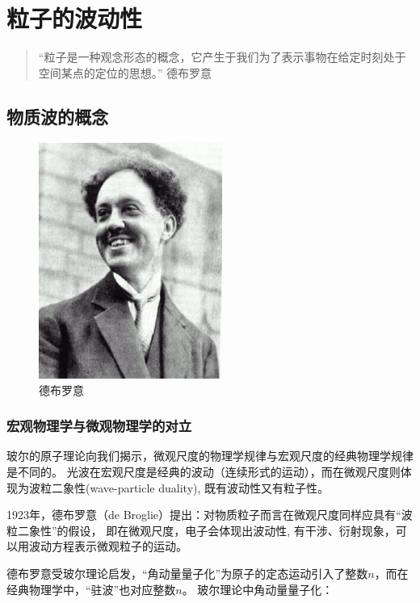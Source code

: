 \section{粒子的波动性}

\begin{quotation}
“粒子是一种观念形态的概念，它产生于我们为了表示事物在给定时刻处于空间某点的定位的思想。” \qquad 德布罗意
\end{quotation}

\subsection{物质波的概念}

\begin{figure}[h]
\begin{center}
\includegraphics[clip,width=6cm]{Duality/debroglie.ps}
\caption{德布罗意}
\end{center}
\end{figure}

\subsubsection*{宏观物理学与微观物理学的对立}

玻尔的原子理论向我们揭示，微观尺度的物理学规律与宏观尺度的经典物理学规律是不同的。
光波在宏观尺度是经典的波动（连续形式的运动），而在微观尺度则体现为波粒二象性(wave-particle
duality), 既有波动性又有粒子性。

1923年，德布罗意（de
Broglie）提出：对物质粒子而言在微观尺度同样应具有``波粒二象性''的假设，
即在微观尺度，电子会体现出波动性,
有干涉、衍射现象，可以用波动方程表示微观粒子的运动。


德布罗意受玻尔理论启发，``角动量量子化''为原子的定态运动引入了整数$n$，而在经典物理学中，``驻波''也对应整数$n$。
玻尔理论中角动量量子化：

